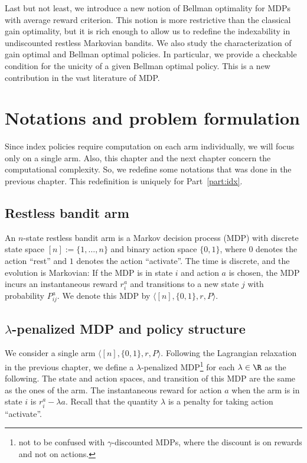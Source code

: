 Last but not least, we introduce a new notion of Bellman optimality for MDPs with average reward criterion. This notion is more restrictive than the classical gain optimality, but it is rich enough to allow us to redefine the indexability in undiscounted restless Markovian bandits. We also study the characterization of gain optimal and Bellman optimal policies. In particular, we provide a checkable condition for the unicity of a given Bellman optimal policy. This is a new contribution in the vast literature of MDP.

\section{Notations and problem formulation}
\label{ch:idx:sec:notation}

Since index policies require computation on each arm individually, we will focus only on a single arm.
Also, this chapter and the next chapter concern the computational complexity.
So, we redefine some notations that was done in the previous chapter.
This redefinition is uniquely for Part~\ref{part:idx}.

\subsection{Restless bandit arm}

An $n$-state restless bandit arm is a Markov decision process (MDP) with discrete state space $[n]:=\{1,\dots, n\}$ and binary action space $\{0, 1\}$, where $0$ denotes the action ``rest'' and $1$ denotes the action ``activate''. The time is discrete, and the evolution is Markovian: If the MDP is in state $i$ and action $a$ is chosen, the MDP incurs an instantaneous reward ${r}^a_i$ and transitions to a new state $j$ with probability ${P}^a_{ij}$. We denote this MDP by $\langle[n],\{0,1\},r,P\rangle$.

\subsection{\texorpdfstring{$\lambda$-p}{P}enalized MDP and policy structure}
\label{ch:idx:sec:penal_mdp}

We consider a single arm $\langle[n],\{0,1\},r,P\rangle$.
Following the Lagrangian relaxation in the previous chapter, we define a $\lambda$-penalized MDP\footnote{not to be confused with $\gamma$-discounted MDPs, where the discount is on rewards and not on actions.} for each $\lambda\in\R$ as the following.
The state and action spaces, and transition of this MDP are the same as the ones of the arm.
The instantaneous reward for action $a$ when the arm is in state $i$ is $r^a_i-\lambda a$.
Recall that the quantity $\lambda$ is a penalty for taking action ``activate''.

